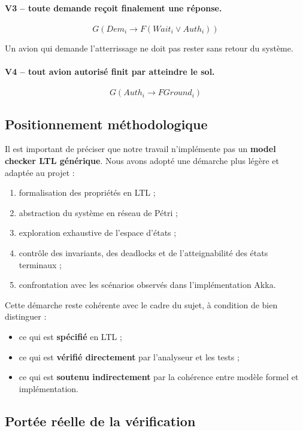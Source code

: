 \documentclass[11pt,a4paper]{article}
\begin{document}
\paragraph{V3 -- toute demande reçoit finalement une réponse.}
\[
G(Dem_i \rightarrow F(Wait_i \lor Auth_i))
\]

Un avion qui demande l'atterrissage ne doit pas rester sans retour du système.

\paragraph{V4 -- tout avion autorisé finit par atteindre le sol.}
\[
G(Auth_i \rightarrow F Ground_i)
\]

\subsection{Positionnement méthodologique}

Il est important de préciser que notre travail n'implémente pas un \textbf{model checker LTL générique}. Nous avons adopté une démarche plus légère et adaptée au projet :
\begin{enumerate}
    \item formalisation des propriétés en LTL ;
    \item abstraction du système en réseau de Pétri ;
    \item exploration exhaustive de l'espace d'états ;
    \item contrôle des invariants, des deadlocks et de l'atteignabilité des états terminaux ;
    \item confrontation avec les scénarios observés dans l'implémentation Akka.
\end{enumerate}

Cette démarche reste cohérente avec le cadre du sujet, à condition de bien distinguer :
\begin{itemize}
    \item ce qui est \textbf{spécifié} en LTL ;
    \item ce qui est \textbf{vérifié directement} par l'analyseur et les tests ;
    \item ce qui est \textbf{soutenu indirectement} par la cohérence entre modèle formel et implémentation.
\end{itemize}

\subsection{Portée réelle de la vérification}
\end{document}

